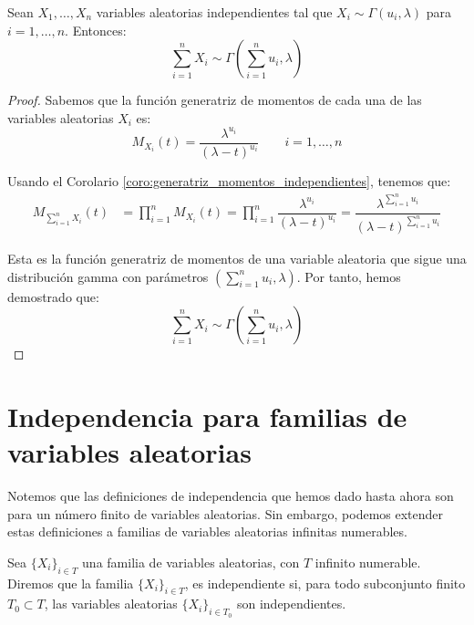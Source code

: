 \begin{prop}
    Sean $X_1, \dots, X_n$ variables aleatorias independientes tal que $X_i\sim \Gamma(u_i,\lambda)$ para $i=1,\dots,n$. Entonces:
    \begin{equation*}
        \sum_{i=1}^{n}X_i \sim \Gamma\left(\sum_{i=1}^{n}u_i,\lambda\right)
    \end{equation*}

    \begin{proof}
        Sabemos que la función generatriz de momentos de cada una de las variables aleatorias $X_i$ es:
        \begin{equation*}
            M_{X_i}(t) = \dfrac{\lambda^{u_i}}{(\lambda-t)^{u_i}} \qquad i=1,\dots,n
        \end{equation*}
    
        Usando el Corolario \ref{coro:generatriz_momentos_independientes}, tenemos que:
        \begin{align*}
            M_{\sum\limits_{i=1}^{n}X_i}(t) &= \prod_{i=1}^{n}M_{X_i}(t) = \prod_{i=1}^{n}\dfrac{\lambda^{u_i}}{(\lambda-t)^{u_i}} = \dfrac{\lambda^{\sum\limits_{i=1}^{n}u_i}}{(\lambda-t)^{\sum\limits_{i=1}^{n}u_i}}
        \end{align*}

        Esta es la función generatriz de momentos de una variable aleatoria que sigue una distribución gamma con parámetros $\left(\sum\limits_{i=1}^{n}u_i,\lambda\right)$. Por tanto, hemos demostrado que:
        \begin{equation*}
            \sum_{i=1}^{n}X_i \sim \Gamma\left(\sum_{i=1}^{n}u_i,\lambda\right)
        \end{equation*}
    \end{proof}
\end{prop}


\section{Independencia para familias de variables aleatorias}

Notemos que las definiciones de independencia que hemos dado hasta ahora son para un número finito de variables aleatorias. Sin embargo, podemos extender estas definiciones a familias de variables aleatorias infinitas numerables.
\begin{definicion}
    Sea $\{X_i\}_{i\in T}$ una familia de variables aleatorias, con $T$ infinito numerable. Diremos que la familia $\{X_i\}_{i\in T}$, es independiente si, para todo subconjunto finito $T_0\subset T$, las variables aleatorias $\{X_i\}_{i\in T_0}$ son independientes.
\end{definicion}

